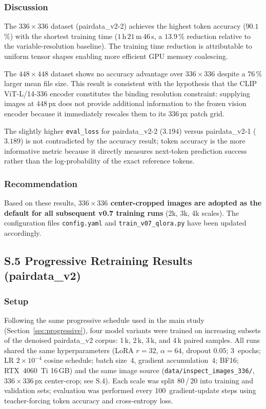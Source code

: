 ﻿\documentclass[onecolumn]{article}
\begin{document}
\subsubsection*{Discussion}

The $336\times336$ dataset (pairdata\_v2-2) achieves the highest
token accuracy ($90.1$\,\%) with the shortest training time
($1$\,h\,$21$\,m\,$46$\,s, a $13.9$\,\% reduction relative to the
variable-resolution baseline).
The training time reduction is attributable to uniform tensor shapes
enabling more efficient GPU memory coalescing.

The $448\times448$ dataset shows no accuracy advantage over $336\times336$
despite a $76$\,\% larger mean file size.
This result is consistent with the hypothesis that the CLIP
ViT-L/14-336 encoder constitutes the binding resolution constraint:
supplying images at $448$\,px does not provide additional information
to the frozen vision encoder because it immediately rescales them
to its $336$\,px patch grid.

The slightly higher \texttt{eval\_loss} for pairdata\_v2-2 ($3.194$)
versus pairdata\_v2-1 ($3.189$) is not contradicted by the accuracy
result; token accuracy is the more informative metric because it
directly measures next-token prediction success rather than the
log-probability of the exact reference tokens.

\subsubsection*{Recommendation}

Based on these results, \textbf{$336\times336$ center-cropped images
are adopted as the default for all subsequent v0.7 training runs}
(2k, 3k, 4k scales).
The configuration files \texttt{config.yaml} and
\texttt{train\_v07\_qlora.py} have been updated accordingly.

\subsection*{S.5 Progressive Retraining Results (pairdata\_v2)}

\subsubsection*{Setup}

Following the same progressive schedule used in the main study
(Section~\ref{sec:progressive}), four model variants were trained
on increasing subsets of the denoised pairdata\_v2 corpus:
1\,k, 2\,k, 3\,k, and 4\,k paired samples.
All runs shared the same hyperparameters (LoRA $r{=}32$, $\alpha{=}64$,
dropout $0.05$; 3~epochs; LR $2\times10^{-4}$ cosine schedule; batch
size~4, gradient accumulation~4; BF16; RTX~4060~Ti 16\,GB) and the same
image source (\texttt{data/inspect\_images\_336/}, $336\times336$\,px
center-crop; see S.4).
Each scale was split 80\,/\,20 into training and validation sets;
evaluation was performed every 100~gradient-update steps using
teacher-forcing token accuracy and cross-entropy loss.
\end{document}
